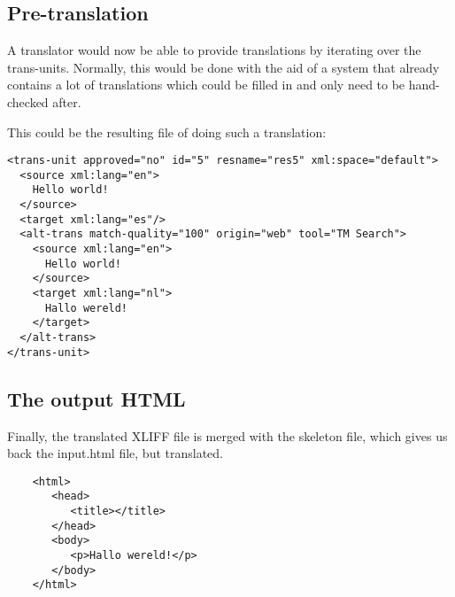\subsection{Pre-translation}

 A translator would now be able to provide translations by iterating over the trans-units. Normally, this would be done with the aid of a system that already contains a lot of translations which could be filled in and only need to be hand-checked after.

This could be the resulting file of doing such a translation:

\begin{verbatim}
<trans-unit approved="no" id="5" resname="res5" xml:space="default">
  <source xml:lang="en">
    Hello world!
  </source>
  <target xml:lang="es"/>
  <alt-trans match-quality="100" origin="web" tool="TM Search">
    <source xml:lang="en">
      Hello world!
    </source>
    <target xml:lang="nl">
      Hallo wereld!
    </target>
  </alt-trans>
</trans-unit>
\end{verbatim}

\subsection{The output HTML}

Finally, the translated XLIFF file is merged with the skeleton file, which gives us back the input.html file, but translated. 

\begin{verbatim}
    <html>
       <head>
          <title></title>
       </head>
       <body>
          <p>Hallo wereld!</p>
       </body>
    </html>
\end{verbatim}
